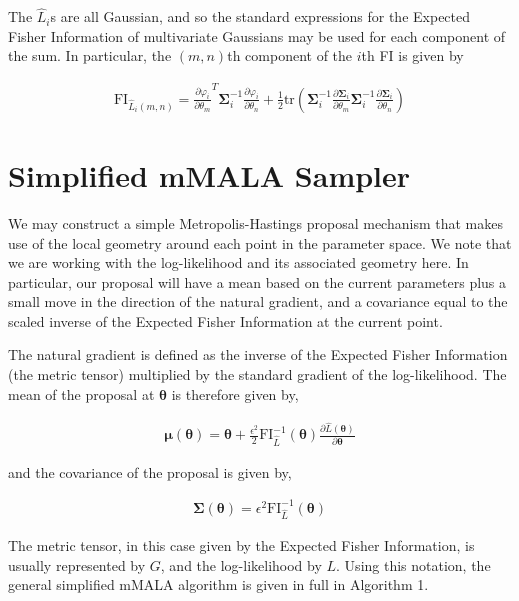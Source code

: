 \documentclass[11pt]{amsart}
\begin{document}
\noindent The $\hat{L}_i$s are all Gaussian, and so the standard expressions for the Expected Fisher Information of multivariate Gaussians may be used for each component of the sum.  In particular, the $(m,n)$th component of the $i$th FI is given by

\begin{eqnarray}
\text{FI}_{\hat{L}_i (m,n)} = \frac{\partial \varphi_i}{\partial \theta_m}^T \boldsymbol\Sigma_i^{-1} \frac{\partial \varphi_i}{\partial \theta_n} + \frac{1}{2}\text{tr}\left( \boldsymbol\Sigma_i^{-1} \frac{\partial \boldsymbol\Sigma_i}{\partial \theta_m} \boldsymbol\Sigma_i^{-1} \frac{\partial \boldsymbol\Sigma_i}{\partial \theta_n} \right)
\end{eqnarray}


\section{Simplified mMALA Sampler}

We may construct a simple Metropolis-Hastings proposal mechanism that makes use of the local geometry around each point in the parameter space.  We note that we are working with the log-likelihood and its associated geometry here.  In particular, our proposal will have a mean based on the current parameters plus a small move in the direction of the natural gradient, and a covariance equal to the scaled inverse of the Expected Fisher Information at the current point.

The natural gradient is defined as the inverse of the Expected Fisher Information (the metric tensor) multiplied by the standard gradient of the log-likelihood.  The mean of the proposal at $\boldsymbol\theta$ is therefore given by,

\begin{eqnarray}
\boldsymbol\mu(\boldsymbol\theta) = \boldsymbol\theta + \frac{\epsilon^2}{2} \text{FI}_{\hat{L}}^{-1}(\boldsymbol\theta)  \frac{\partial \hat{L}(\boldsymbol\theta)}{\partial \boldsymbol\theta}
\end{eqnarray}

\noindent and the covariance of the proposal is given by,

\begin{eqnarray}
\boldsymbol\Sigma(\boldsymbol\theta) = \epsilon^2 \text{FI}_{\hat{L}}^{-1}(\boldsymbol\theta)
\end{eqnarray}


The metric tensor, in this case given by the Expected Fisher Information, is usually represented by $G$, and the log-likelihood by $L$.  Using this notation, the general simplified mMALA algorithm is given in full in Algorithm 1.
\end{document}
